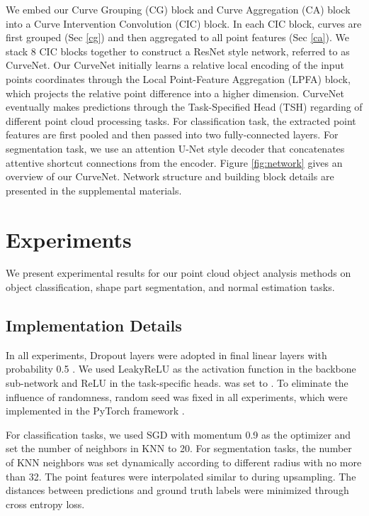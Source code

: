 \documentclass[10pt,twocolumn,letterpaper]{article}
\theoremstyle{definition}
\begin{document}
We embed our Curve Grouping (CG) block and Curve Aggregation (CA) block into a Curve Intervention Convolution (CIC) block. In each CIC block, curves are first grouped (Sec \ref{cg}) and then aggregated to all point features (Sec \ref{ca}). We stack 8 CIC blocks together to construct a ResNet \cite{he2016deep} style network, referred to as CurveNet. Our CurveNet initially learns a relative local encoding of the input points coordinates through the Local Point-Feature Aggregation (LPFA) block, which projects the relative point difference into a higher dimension. CurveNet eventually makes predictions through the Task-Specified Head (TSH) regarding of different point cloud processing tasks. For classification task, the extracted point features are first pooled and then passed into two fully-connected layers. For segmentation task, we use an attention U-Net \cite{oktay2018attention} style decoder that concatenates attentive shortcut connections from the encoder. Figure \ref{fig:network} gives an overview of our CurveNet. Network structure and building block details are presented in the supplemental materials.















\section{Experiments} \label{exp}
We present experimental results for our point cloud object analysis methods on object classification, shape part segmentation, and normal estimation tasks. 



\subsection{Implementation Details}
In all experiments, Dropout layers \cite{srivastava2014dropout} were adopted in final linear layers with probability 0.5 \cite{wang2019dynamic}. We used LeakyReLU as the activation function in the backbone sub-network and ReLU in the task-specific heads.  was set to . To eliminate the influence of randomness, random seed was fixed in all experiments, which were implemented in the PyTorch framework \cite{paszke2019pytorch}.

For classification tasks, we used SGD with momentum 0.9 as the optimizer and set the number of neighbors in KNN to 20. For segmentation tasks, the number of KNN neighbors was set dynamically according to different radius with no more than 32. The point features were interpolated similar to \cite{qi2017pointnet} during upsampling. The distances between predictions and ground truth labels were minimized through cross entropy loss.
\end{document}
